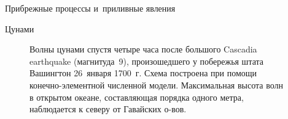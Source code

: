 \begin{chapter}{Прибрежные процессы и~приливные явления}
\begin{section}{Цунами}
\begin{figure}[t!]
\caption{Волны цунами спустя четыре часа
после большого Cascadia earthquake (магнитуда~9), произошедшего 
у побережья штата Вашингтон 26~января 1700~г. Схема построена при помощи
конечно-элементной численной модели. Максимальная высота волн в открытом
океане, составляющая порядка одного метра, наблюдается к северу от Гавайских
о-вов.~\cite{Satake:1996}}
\label{fig:tsunamiwave}
\end{figure}
%
%


\end{section}
\end{chapter}
